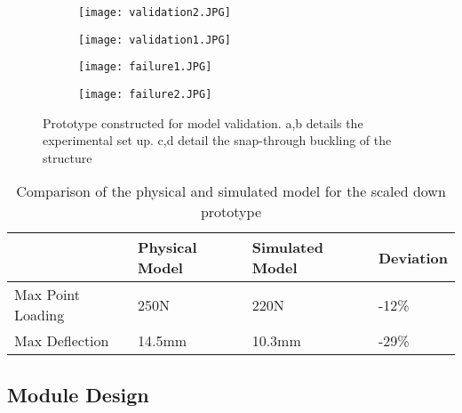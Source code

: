 \begin{figure}
    \centering
    \begin{subfigure}[b]{0.47\textwidth}
        \texttt{[image: validation2.JPG]}
        \caption{} 
        \label{fig:validation1}
    \end{subfigure} 
    \begin{subfigure}[b]{0.47\textwidth}
        \texttt{[image: validation1.JPG]}
        \caption{}
        \label{fig:validation2}
    \end{subfigure}
    \hfill
        \begin{subfigure}[b]{0.47\textwidth}
        \texttt{[image: failure1.JPG]}
        \caption{} 
        \label{fig:failure1}
    \end{subfigure} 
    \begin{subfigure}[b]{0.47\textwidth}
        \texttt{[image: failure2.JPG]}
        \caption{}
        \label{fig:failure2}
    \end{subfigure}

    \caption{Prototype constructed for model validation. a,b details the experimental set up. c,d detail the snap-through buckling of the structure}
    \label{fig:validation}
\end{figure}

\begin{table}
\begin{tabular}{llll}
                                 & Physical Model & Simulated Model & Deviation \\
\hline
Max Point Loading & 250N           & 220N   & -12\%         \\
Max Deflection & 14.5mm         & 10.3mm  & -29\%        \\
\hline
\end{tabular}
\caption{Comparison of the physical and simulated model for the scaled down prototype}
\label{tab: validation}
\end{table}

\subsection{Module Design}

